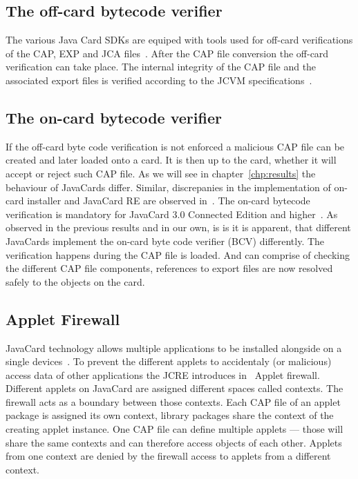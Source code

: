     \subsection{The off-card bytecode verifier}

The various Java Card SDKs are equiped with tools used for off-card verifications of the CAP, EXP and JCA files~\cite{jcoffcardverifier}. After the CAP file conversion the off-card verification can take place. The internal integrity of the CAP file and the associated export files is verified according to the JCVM specifications~\cite{jcspecs31download}.

    \subsection{The on-card bytecode verifier}

    If the off-card byte code verification is not enforced a malicious CAP file can be created and later loaded onto a card. It is then up to the card, whether it will accept or reject such CAP file. As we will see in chapter~\ref{chp:results} the behaviour of JavaCards differ. Similar, discrepanies in the implementation of on-card installer and JavaCard RE are observed in~\cite{lanettrojan}. The on-card bytecode verification is mandatory for JavaCard 3.0 Connected Edition and higher~\cite{barbusecond}. As observed in the previous results and in our own, is is it is apparent, that different JavaCards implement the on-card byte code verifier (BCV) differently. The verification happens during the CAP file is loaded. And can comprise of checking the different CAP file components, references to export files are now resolved safely to the objects on the card.


    \subsection{Applet Firewall}

    JavaCard technology allows multiple applications to be installed alongside on a single devices~\cite{jcspecs31download}. To prevent the different applets to accidentaly (or malicious) access data of other applications the JCRE introduces in~\cite{jcspecs31download} Applet firewall. Different applets on JavaCard are assigned different spaces called contexts. The firewall acts as a boundary between those contexts. Each CAP file of an applet package is assigned its own context, library packages share the context of the creating applet instance. One CAP file can define multiple applets --- those will share the same contexts and can therefore access objects of each other. Applets from one context are denied by the firewall access to applets from a different context.

